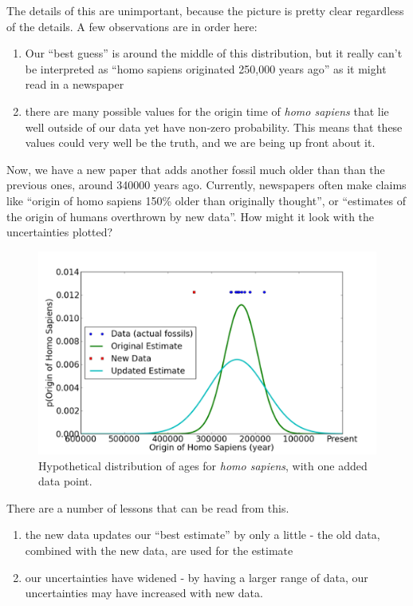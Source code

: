 The details of this are unimportant, because the picture is pretty clear regardless of the details.  A few observations are in order here:

\begin{enumerate}
\def\labelenumi{\arabic{enumi}.}
\itemsep1pt\parskip0pt
\item
  Our ``best guess'' is around the middle of this distribution, but it
  really can't be interpreted as ``homo sapiens originated 250,000 years
  ago'' as it might read in a newspaper
\item
  there are many possible values for the origin time of {\em homo sapiens} that lie well outside of our data yet have non-zero probability.  This means that these values could very well be the truth, and we are being up front about it.
\end{enumerate}

Now, we have a new paper that adds another fossil much older than than
the previous ones, around 340000 years ago. Currently, newspapers often make claims like ``origin of homo sapiens 150\% older than originally thought'', or ``estimates of the origin of humans overthrown by new data''. How might it look with the uncertainties plotted?

\begin{figure}[htbp]
\centering
\includegraphics{img/blah3-2011-01-29-11-35.png}
\caption{Hypothetical distribution of ages for {\em homo sapiens}, with one added data point.}
\end{figure}

There are a number of lessons that can be read from this.

\begin{enumerate}
\def\labelenumi{\arabic{enumi}.}
\itemsep1pt\parskip0pt
\item
  the new data updates our ``best estimate'' by only a little - the old
  data, combined with the new data, are used for the estimate
\item
  our uncertainties have widened - by having a larger range of data, our
  uncertainties may have increased with new data.
\end{enumerate}

